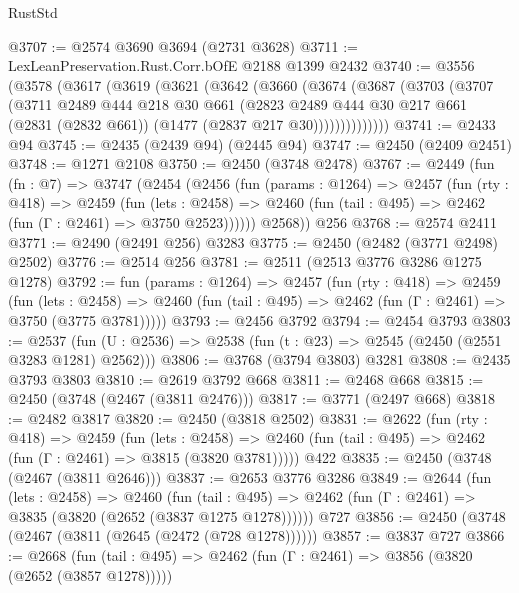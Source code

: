 \begin{lexlean}{RustStd}
\begin{coremodule}
@3707 := @2574 @3690 @3694 (@2731 @3628)
@3711 := LexLeanPreservation.Rust.Corr.bOfE @2188 @1399 @2432
@3740 := @3556
    (@3578
      (@3617
        (@3619
          (@3621
            (@3642
              (@3660
                (@3674
                  (@3687
                    (@3703
                      (@3707
                        (@3711
                          @2489
                          @444
                          @218
                          @30
                          @661
                          (@2823
                            @2489
                            @444
                            @30
                            @217
                            @661
                            (@2831 (@2832 @661))
                            (@1477 (@2837 @217 @30))))))))))))))
@3741 := @2433 @94
@3745 := @2435 (@2439 @94) (@2445 @94)
@3747 := @2450 (@2409 @2451)
@3748 := @1271 @2108
@3750 := @2450 (@3748 @2478)
@3767 := @2449
    (fun (fn : @7) =>
    @3747
      (@2454
        (@2456
          (fun (params : @1264) =>
          @2457
            (fun (rty : @418) =>
            @2459
              (fun (lets : @2458) =>
              @2460 (fun (tail : @495) => @2462 (fun (Γ : @2461) => @3750 @2523))))))
        @2568))
    @256
@3768 := @2574 @2411
@3771 := @2490 (@2491 @256) @3283
@3775 := @2450 (@2482 (@3771 @2498) @2502)
@3776 := @2514 @256
@3781 := @2511 (@2513 @3776 @3286 @1275 @1278)
@3792 := fun (params : @1264) =>
  @2457
    (fun (rty : @418) =>
    @2459
      (fun (lets : @2458) =>
      @2460 (fun (tail : @495) => @2462 (fun (Γ : @2461) => @3750 (@3775 @3781)))))
@3793 := @2456 @3792
@3794 := @2454 @3793
@3803 := @2537 (fun (U : @2536) => @2538 (fun (t : @23) => @2545 (@2450 (@2551 @3283 @1281) @2562)))
@3806 := @3768 (@3794 @3803) @3281
@3808 := @2435 @3793 @3803
@3810 := @2619 @3792 @668
@3811 := @2468 @668
@3815 := @2450 (@3748 (@2467 (@3811 @2476)))
@3817 := @3771 (@2497 @668)
@3818 := @2482 @3817
@3820 := @2450 (@3818 @2502)
@3831 := @2622
    (fun (rty : @418) =>
    @2459
      (fun (lets : @2458) =>
      @2460 (fun (tail : @495) => @2462 (fun (Γ : @2461) => @3815 (@3820 @3781)))))
    @422
@3835 := @2450 (@3748 (@2467 (@3811 @2646)))
@3837 := @2653 @3776 @3286
@3849 := @2644
    (fun (lets : @2458) =>
    @2460
      (fun (tail : @495) => @2462 (fun (Γ : @2461) => @3835 (@3820 (@2652 (@3837 @1275 @1278))))))
    @727
@3856 := @2450 (@3748 (@2467 (@3811 (@2645 (@2472 (@728 @1278))))))
@3857 := @3837 @727
@3866 := @2668
    (fun (tail : @495) => @2462 (fun (Γ : @2461) => @3856 (@3820 (@2652 (@3857 @1278)))))

\end{coremodule}
\end{lexlean}
